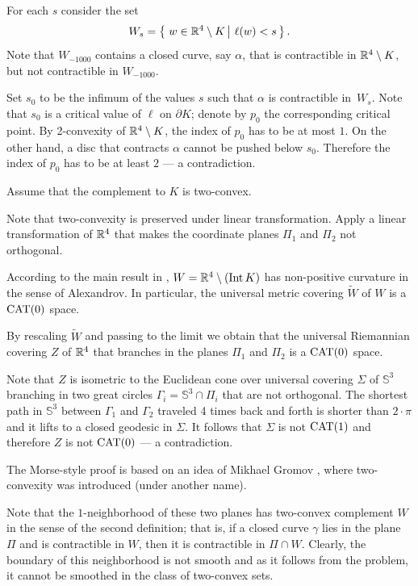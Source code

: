 For each $s$ consider the set 
$$W_s=\set{w\in \RR^4\setminus K}{\ell(w)<s}.$$
Note that $W_{-1000}$ contains a closed curve, say $\alpha$, that is contractible in $\mathbb{R}^4\setminus K$, but not contractible in $W_{-1000}$.

Set $s_0$ to be the infimum of the values $s$ such that
$\alpha$ is contractible in~$W_s$.
Note that $s_0$ is a critical value of $\ell$ on $\partial K$;
denote by $p_0$ the corresponding critical point.
By 2-convexity of $\mathbb{R}^4\setminus K$,
the index of $p_0$ has to be at most $1$.
On the other hand, a disc that contracts $\alpha$ cannot be pushed below $s_0$.
Therefore the index of $p_0$ has to be at least $2$ --- a contradiction.
\qeds

Assume that the complement to $K$ is two-convex.

Note that two-convexity is preserved under linear transformation.
Apply a linear transformation of $\mathbb{R}^4$ that makes the coordinate planes $\Pi_1$ and $\Pi_2$ not orthogonal.

According to the main result in \cite{ABB}, $W\z=\RR^4\setminus (\Int K)$ has non-positive curvature in the sense of Alexandrov.
In particular, the universal metric covering $\tilde W$ of $W$ is a $\operatorname{\rm CAT}\nolimits(0)$ space.

By rescaling $\tilde W$ and passing to the limit we obtain that the universal Riemannian covering $Z$ of $\mathbb{R}^4$ that branches in the planes $\Pi_1$ and $\Pi_2$ is a $\operatorname{\rm CAT}\nolimits(0)$ space.

Note that $Z$ is isometric to the Euclidean cone over universal covering $\Sigma$ of $\mathbb{S}^3$ branching in two great circles $\Gamma_i=\mathbb{S}^3\cap \Pi_i$ that are not orthogonal.
The shortest path in $\mathbb{S}^3$ between $\Gamma_1$ and $\Gamma_2$ traveled 4 times back and forth is shorter than $2\cdot\pi$ and it lifts to a closed geodesic in $\Sigma$.
It follows that $\Sigma$ is not $\operatorname{\rm CAT}\nolimits(1)$ and therefore $Z$ is not $\operatorname{\rm CAT}\nolimits(0)$ --- a contradiction.\qeds

The Morse-style proof is based on an idea of Mikhael Gromov \cite[see \S\textonehalf{} in][]{gromov-SGMC}, where two-convexity was introduced (under another name).

Note that the $1$-neighborhood of these two planes has two-convex complement $W$ in the sense of the second definition;
that is, if a closed curve $\gamma$ lies in the plane $\Pi$
and is contractible in $W$, then it is contractible in $\Pi\cap W$.
Clearly, the boundary of this neighborhood is not smooth
and as it follows from the problem, it cannot be smoothed in the class of two-convex sets. 

